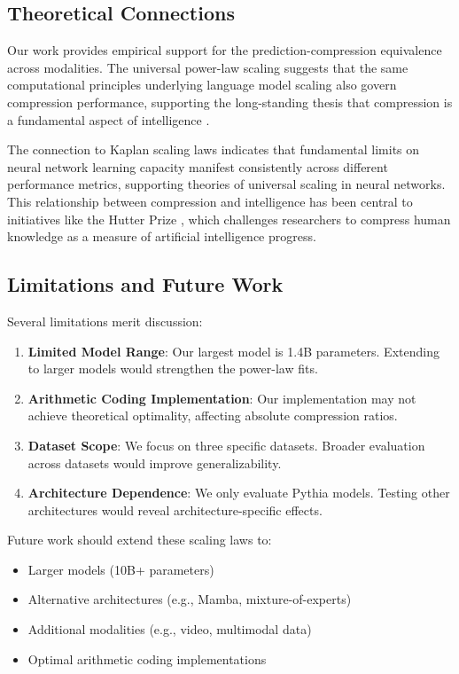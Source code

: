 \documentclass[11pt]{article}
\begin{document}
\subsection{Theoretical Connections}

Our work provides empirical support for the prediction-compression equivalence across modalities. The universal power-law scaling suggests that the same computational principles underlying language model scaling also govern compression performance, supporting the long-standing thesis that compression is a fundamental aspect of intelligence \citep{legg2007universal}.

The connection to Kaplan scaling laws indicates that fundamental limits on neural network learning capacity manifest consistently across different performance metrics, supporting theories of universal scaling in neural networks. This relationship between compression and intelligence has been central to initiatives like the Hutter Prize \citep{hutter2006human}, which challenges researchers to compress human knowledge as a measure of artificial intelligence progress.

\subsection{Limitations and Future Work}

Several limitations merit discussion:

\begin{enumerate}
\item \textbf{Limited Model Range}: Our largest model is 1.4B parameters. Extending to larger models would strengthen the power-law fits.
\item \textbf{Arithmetic Coding Implementation}: Our implementation may not achieve theoretical optimality, affecting absolute compression ratios.
\item \textbf{Dataset Scope}: We focus on three specific datasets. Broader evaluation across datasets would improve generalizability.
\item \textbf{Architecture Dependence}: We only evaluate Pythia models. Testing other architectures would reveal architecture-specific effects.
\end{enumerate}

Future work should extend these scaling laws to:
\begin{itemize}
\item Larger models (10B+ parameters)
\item Alternative architectures (e.g., Mamba, mixture-of-experts)
\item Additional modalities (e.g., video, multimodal data)
\item Optimal arithmetic coding implementations
\end{itemize}
\end{document}
